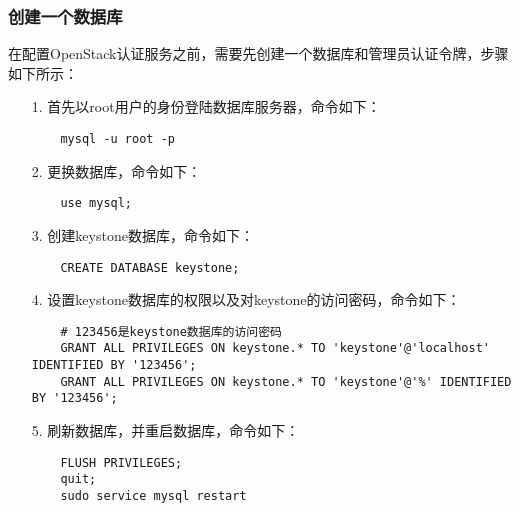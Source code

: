 \documentclass[a4paper,left=2.5cm,right=2.5cm,11pt]{article}
\begin{document}
\subsubsection{创建一个数据库}
	在配置OpenStack认证服务之前，需要先创建一个数据库和管理员认证令牌，步骤如下所示：
	\begin{itemize}
		\item[1.] 首先以root用户的身份登陆数据库服务器，命令如下：
		\begin{lstlisting}
	mysql -u root -p
		\end{lstlisting}

		\item[2.] 更换数据库，命令如下：
		\begin{lstlisting}
	use mysql;
		\end{lstlisting}

		\item[3.] 创建keystone数据库，命令如下：
		\begin{lstlisting}
	CREATE DATABASE keystone;
		\end{lstlisting}

		\item[4.] 设置keystone数据库的权限以及对keystone的访问密码，命令如下：
		\begin{lstlisting}
	# 123456是keystone数据库的访问密码
	GRANT ALL PRIVILEGES ON keystone.* TO 'keystone'@'localhost' IDENTIFIED BY '123456';
	GRANT ALL PRIVILEGES ON keystone.* TO 'keystone'@'%' IDENTIFIED BY '123456';
		\end{lstlisting}

		\item[5.] 刷新数据库，并重启数据库，命令如下：
		\begin{lstlisting}
	FLUSH PRIVILEGES;
	quit;
	sudo service mysql restart
		\end{lstlisting}
	\end{itemize}
\end{document}
